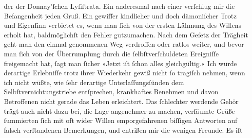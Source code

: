 \begin{ledgroupsized}[t]{13cm}
                    der \label{K_L01840_1v}\label{K_L01840_1h} der Donnay’ſchen
                    {\pb}Lyſiſtrata. Ein anderesmal nach einer \label{K_L01840_2v}\label{K_L01840_2h} verſchlug mir
                    die Befangenheit jeden Gruß. Ein gewiſſer kindlicher und doch dämoniſcher Trotz
                    und Eigenſinn verbietet es, wenn man ſich von der ersten Lähmung des Willens
                    erholt hat, baldmöglichſt den Fehler gutzumachen. Nach dem Geſetz der Trägheit
                    geht man den einmal genommenen Weg verdroſſen oder ratlos weiter, und bevor man
                    ſich von der Überrumplung durch die ſelbſtverſchuldeten Ereigniſſe freigemacht
                    hat, ſagt man ſicher »Jetzt iſt ſchon alles gleichgültig.« Ich würde derartige
                    Erlebniſſe trotz ihrer Wiederkehr gewiß nicht ſo tragiſch nehmen, wenn ich nicht
                    wüßte, wie ſehr derartige Unterlaſſungsſünden dem Selbſtvernichtungstriebe
                    entſprechen, krankhaftes Benehmen und davon Betroffenen nicht gerade das Leben
                    erleichtert. Das ſchlechter werdende Gehör trägt auch nicht dazu bei, {\pb}die Lage angenehmer zu machen, verſäumte Grüße
                    ſummierten ſich mit oft wider Willen emporgefahrenen biſſigen Antworten auf
                    falsch verſtandenen Bemerkungen, und entrißen mir die wenigen Freunde. Es iſt

\end{ledgroupsized}
